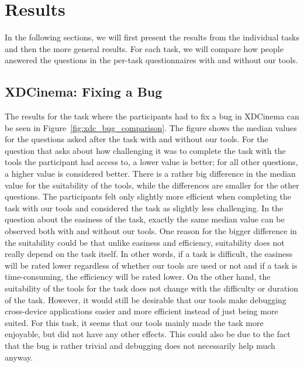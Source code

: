 \section{Results}

In the following sections, we will first present the results from the individual tasks and then the more general results. For each task, we will compare how people answered the questions in the per-task questionnaires with and without our tools. 

\subsection{XDCinema: Fixing a Bug}

The results for the task where the participants had to fix a bug in XDCinema can be seen in Figure~\ref{fig:xdc_bug_comparison}. The figure shows the median values for the questions asked after the task with and without our tools. For the question that asks about how challenging it was to complete the task with the tools the participant had access to, a lower value is better; for all other questions, a higher value is considered better. There is a rather big difference in the median value for the suitability of the tools, while the differences are smaller for the other questions. The participants felt only slightly more efficient when completing the task with our tools and considered the task as slightly less challenging. In the question about the easiness of the task, exactly the same median value can be observed both with and without our tools. One reason for the bigger difference in the suitability could be that unlike easiness and efficiency, suitability does not really depend on the task itself. In other words, if a task is difficult, the easiness will be rated lower regardless of whether our tools are used or not and if a task is time-consuming, the efficiency will be rated lower. On the other hand, the suitability of the tools for the task does not change with the difficulty or duration of the task. However, it would still be desirable that our tools make debugging cross-device applications easier and more efficient instead of just being more suited. For this task, it seems that our tools mainly made the task more enjoyable, but did not have any other effects. This could also be due to the fact that the bug is rather trivial and debugging does not necessarily help much anyway.


